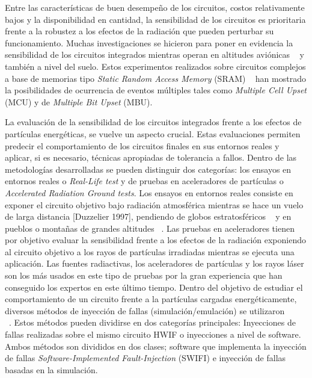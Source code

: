 \documentclass[a4paper,openright,12pt]{report}
\begin{document}
Entre las características de buen desempeño de los circuitos, costos relativamente bajos y la disponibilidad en cantidad,  la sensibilidad de los circuitos es prioritaria frente a la robustez a los efectos de la radiación que pueden perturbar su funcionamiento. Muchas investigaciones se hicieron  para poner en evidencia la sensibilidad de los circuitos integrados mientras operan en altitudes aviónicas ~\cite{Normand1996} y también a nivel del suelo. Estos experimentos realizados sobre circuitos complejos a base de memorias tipo  \textit{Static Random Access Memory} (SRAM) ~\cite{Baumann2005} han mostrado la posibilidades de ocurrencia de eventos múltiples tales como  \textit{Multiple Cell Upset} (MCU) y de  \textit{Multiple Bit Upset} (MBU). 
%
%
%
%
%

La evaluación de la sensibilidad de los circuitos integrados frente a los efectos de partículas energéticas, se vuelve un aspecto crucial. Estas evaluaciones permiten predecir el comportamiento de los circuitos finales en sus entornos reales y aplicar, si es necesario, técnicas apropiadas de tolerancia a fallos. Dentro de las metodologías desarrolladas se pueden distinguir dos categorías: los ensayos en entornos reales o \textit{Real-Life \textit{test}} y de pruebas en aceleradores de partículas o \textit{Accelerated Radiation Ground \textit{tests}}. Los ensayos en entornos reales consiste en  exponer el circuito objetivo bajo radiación atmosférica mientras se hace un vuelo de larga distancia [Duzzelier 1997], pendiendo de globos estratosféricos ~\cite{Taber1993} y en pueblos o montañas de grandes altitudes ~\cite{Lesea2005}. Las pruebas en aceleradores tienen por objetivo evaluar la sensibilidad frente a los efectos de la radiación exponiendo al circuito objetivo a los rayos de partículas irradiadas mientras se ejecuta una aplicación. Las fuentes radiactivas, los aceleradores de partículas y los rayos láser son los más usados en este tipo de pruebas por la gran experiencia que han conseguido los expertos en este último tiempo. Dentro del objetivo de estudiar el comportamiento de un circuito frente a la partículas cargadas energéticamente, diversos métodos de inyección de fallas (simulación/emulación) se utilizaron ~\cite{Sieh1997} ~\cite{Folkesson1998} ~\cite{Rahbaran2004} ~\cite{Shokrolah2008}. Estos métodos pueden dividirse en dos categorías principales: Inyecciones de fallas realizadas sobre el mismo circuito HWIF o inyecciones a nivel de software. Ambos métodos son divididos en dos clases; software que implementa la inyección de fallas \textit{Software-Implemented Fault-Injection} (SWIFI) e inyección de fallas basadas en la simulación.
\end{document}
